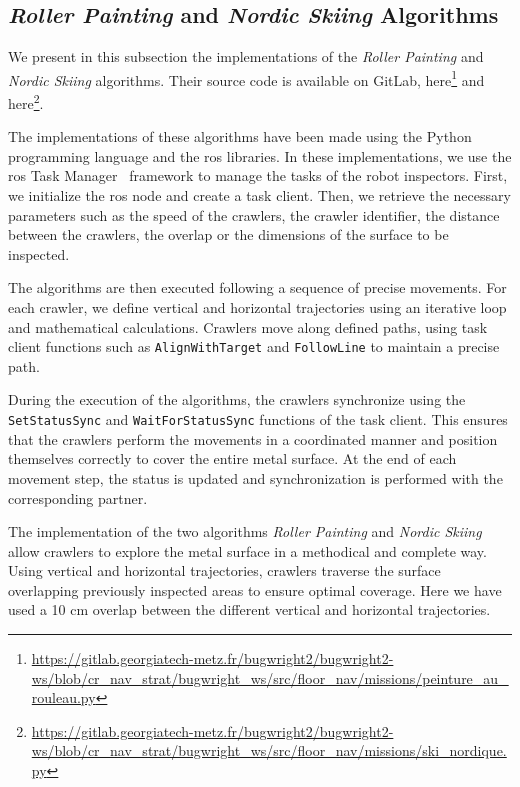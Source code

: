 \subsection*{\textit{Roller Painting} and \textit{Nordic Skiing} Algorithms}

We present in this subsection the implementations of the \textit{Roller Painting} and \textit{Nordic Skiing} algorithms.
Their source code is available on GitLab, here\footnote{\url{https://gitlab.georgiatech-metz.fr/bugwright2/bugwright2-ws/blob/cr_nav_strat/bugwright_ws/src/floor_nav/missions/peinture_au_rouleau.py}} and here\footnote{\url{https://gitlab.georgiatech-metz.fr/bugwright2/bugwright2-ws/blob/cr_nav_strat/bugwright_ws/src/floor_nav/missions/ski_nordique.py}}.

The implementations of these algorithms have been made using the Python programming language and the \gls{ros} libraries.
In these implementations, we use the \gls{ros} Task Manager~\cite{ROSTaskManager} framework to manage the tasks of the robot inspectors.
First, we initialize the \gls{ros} node and create a task client.
Then, we retrieve the necessary parameters such as the speed of the crawlers, the crawler identifier, the distance between the crawlers, the overlap or the dimensions of the surface to be inspected.

The algorithms are then executed following a sequence of precise movements.
For each crawler, we define vertical and horizontal trajectories using an iterative loop and mathematical calculations.
Crawlers move along defined paths, using task client functions such as \texttt{AlignWithTarget} and \texttt{FollowLine} to maintain a precise path.

During the execution of the algorithms, the crawlers synchronize using the \texttt{SetStatusSync} and \texttt{WaitForStatusSync} functions of the task client.
This ensures that the crawlers perform the movements in a coordinated manner and position themselves correctly to cover the entire metal surface.
At the end of each movement step, the status is updated and synchronization is performed with the corresponding partner.

The implementation of the two algorithms \textit{Roller Painting} and \textit{Nordic Skiing} allow crawlers to explore the metal surface in a methodical and complete way.
Using vertical and horizontal trajectories, crawlers traverse the surface overlapping previously inspected areas to ensure optimal coverage.
Here we have used a 10 cm overlap between the different vertical and horizontal trajectories.

